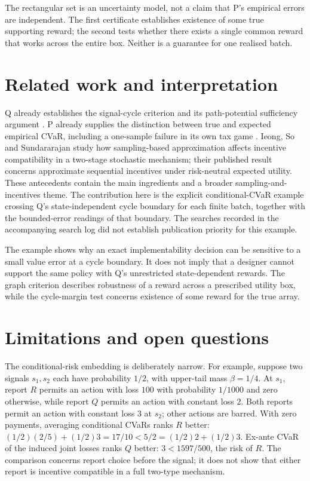 \documentclass{article}
\begin{document}
The rectangular set is an uncertainty model, not a claim that P's empirical errors are independent. The first certificate establishes existence of some true supporting reward; the second tests whether there exists a single common reward that works across the entire box. Neither is a guarantee for one realised batch. %

\section{Related work and interpretation}

Q already establishes the signal-cycle criterion and its path-potential sufficiency argument \cite{bergemann2026alignment}. P already supplies the distinction between true and expected empirical CVaR, including a one-sample failure in its own tax game \cite{pathfinder2026fixedbatch}. Ieong, So and Sundararajan \cite{ieong2007stochastic} study how sampling-based approximation affects incentive compatibility in a two-stage stochastic mechanism; their published result concerns approximate sequential incentives under risk-neutral expected utility. These antecedents contain the main ingredients and a broader sampling-and-incentives theme. The contribution here is the explicit conditional-CVaR example crossing Q's state-independent cycle boundary for each finite batch, together with the bounded-error readings of that boundary. The searches recorded in the accompanying search log did not establish publication priority for this example. %

The example shows why an exact implementability decision can be sensitive to a small value error at a cycle boundary. It does not imply that a designer cannot support the same policy with Q's unrestricted state-dependent rewards. The graph criterion describes robustness of a reward across a prescribed utility box, while the cycle-margin test concerns existence of some reward for the true array. %

\section{Limitations and open questions}

The conditional-risk embedding is deliberately narrow. For example, suppose two signals \(s_1,s_2\) each have probability \(1/2\), with upper-tail mass \(\beta=1/4\). At \(s_1\), report \(R\) permits an action with loss \(100\) with probability \(1/1000\) and zero otherwise, while report \(Q\) permits an action with constant loss \(2\). Both reports permit an action with constant loss \(3\) at \(s_2\); other actions are barred. With zero payments, averaging conditional CVaRs ranks \(R\) better: \((1/2)(2/5)+(1/2)3=17/10<5/2=(1/2)2+(1/2)3\). Ex-ante CVaR of the induced joint losses ranks \(Q\) better: \(3<1597/500\), the risk of \(R\). The comparison concerns report choice before the signal; it does not show that either report is incentive compatible in a full two-type mechanism. %
\end{document}
